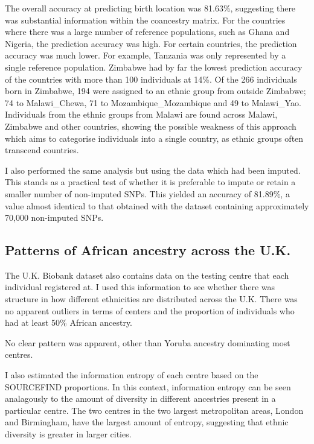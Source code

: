 The overall accuracy at predicting birth location was 81.63\%, suggesting there was substantial information within the coancestry matrix. For the countries where there was a large number of reference populations, such as Ghana and Nigeria, the prediction accuracy was high. For certain countries, the prediction accuracy was much lower. For example, Tanzania was only represented by a single reference population. Zimbabwe had by far the lowest prediction accuracy of the countries with more than 100 individuals at 14\%. Of the 266 individuals born in Zimbabwe, 194 were assigned to an ethnic group from outside Zimbabwe; 74 to Malawi\_Chewa, 71 to Mozambique\_Mozambique and 49 to Malawi\_Yao. Individuals from the ethnic groups from Malawi are found across Malawi, Zimbabwe and other countries, showing the possible weakness of this approach which aims to categorise individuals into a single country, as ethnic groups often transcend countries. 

I also performed the same analysis but using the data which had been imputed. This stands as a practical test of whether it is preferable to impute or retain a smaller number of non-imputed SNPs. This yielded an accuracy of 81.89\%, a value almost identical to that obtained with the dataset containing approximately 70,000 non-imputed SNPs. 


\subsection{Patterns of African ancestry across the U.K.}

The U.K. Biobank dataset also contains data on the testing centre that each individual registered at. I used this information to see whether there was structure in how different ethnicities are distributed across the U.K. There was no apparent outliers in terms of centers and the proportion of individuals who had at least 50\% African ancestry.

No clear pattern was apparent, other than Yoruba ancestry dominating most centres. 
 
I also estimated the information entropy of each centre based on the SOURCEFIND proportions. In this context, information entropy can be seen analagously to the amount of diversity in different ancestries present in a particular centre. The two centres in the two largest metropolitan areas, London and Birmingham, have the largest amount of entropy, suggesting that ethnic diversity is greater in larger cities.

